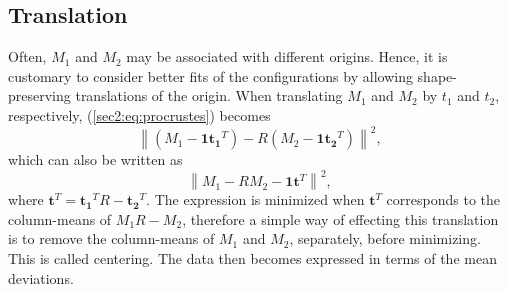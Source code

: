 \subsection{Translation}
\label{sec2:trans}
Often, $M_1$ and $M_2$ may be associated with different origins. Hence, it is customary to consider  better fits of the configurations by allowing shape-preserving translations of the origin.
When translating $M_1$ and $M_2$ by $t_1$ and $t_2$, respectively, (\ref{sec2:eq:procrustes}) becomes
\begin{equation}
\label{sec2:eq:strans1}
\left \|(M_1 - \mathbf{1} \mathbf{t_1}^T) - R(M_2 - \mathbf{1} \mathbf{t_2}^T)\right \|^2,
\end{equation}
which can also be written as
\begin{equation}
\label{sec2:eq:strans2}
\left \| M_1  - RM_2 - \mathbf{1} \mathbf{t}^T\right \|^2,
\end{equation}
where $\mathbf{t}^T = \mathbf{t_1}^T R - \mathbf{t_2}^T$. The expression is minimized when $\mathbf{t}^T$ corresponds to the column-means of $M_1 R - M_2$, therefore a simple way of effecting this translation is to remove the column-means of $M_1$ and $M_2$, separately, before minimizing. This is called centering. The data then becomes expressed in terms of the mean deviations. \cite{procrustes}



